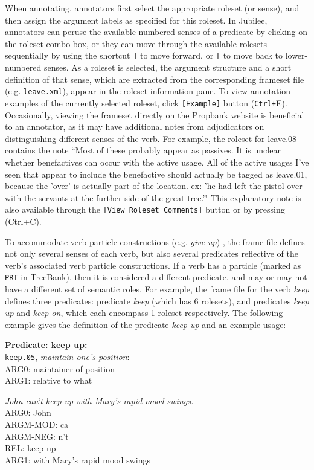 \documentclass[11pt]{report}
\newcommand{\ctrl}{{\tt Ctrl+}}
\begin{document}
\noindent When annotating, annotators first select the appropriate roleset (or sense), and then assign the argument labels as specified for this roleset.  In Jubilee, annotators can peruse the available numbered senses of a predicate by clicking on the roleset combo-box, or they can move through the available rolesets sequentially by using the shortcut {\tt ]} to move forward, or {\tt [} to move back to lower-numbered senses.  As a roleset is selected, the argument structure and a short definition of that sense, which are extracted from the corresponding frameset file (e.g. {\tt leave.xml}), appear in the roleset information pane.   To view annotation examples of the currently selected roleset, click {\tt [Example]} button (\ctrl E). Occasionally, viewing the frameset directly on the Propbank website is beneficial to an annotator, as it may have additional notes from adjudicators on distinguishing different senses of the verb. For example, the roleset for leave.08 contains the note ``Most of these probably appear as passives. It is unclear whether benefactives can occur with the active usage. All of the active usages I've seen that appear to include the benefactive should actually be tagged as leave.01, because the 'over' is actually part of the location. ex: 'he had left the pistol over with the servants at the further side of the great tree.'" This explanatory note is also available through the {\tt[View Roleset Comments]} button or by pressing (Ctrl+C).   

\noindent To accommodate verb particle constructions (e.g. \textit{give up}) , the frame file defines not only several senses of each verb, but also several predicates reflective of the verb's associated verb particle constructions. If a verb has a particle (marked as \texttt{PRT} in TreeBank), then it is considered a different predicate, and may or may not have a different set of semantic roles. For example, the frame file for the verb \textit{keep} defines three predicates: predicate \textit{keep} (which has 6 rolesets), and predicates \textit{keep up} and \textit{keep on}, which each encompass 1 roleset respectively. The following example gives the definition of the predicate \textit{keep up} and an example usage:

\textbf{Predicate:  keep up:}\\
\texttt{keep.05}, \textit{maintain one's position}:\\
ARG0: maintainer of position\\
ARG1: relative to what

\textit{John can't keep up with Mary's rapid mood swings.}\\
ARG0: John \\
ARGM-MOD: ca \\
ARGM-NEG: n't \\
REL: keep up \\
ARG1: with Mary's rapid mood swings
\end{document}

